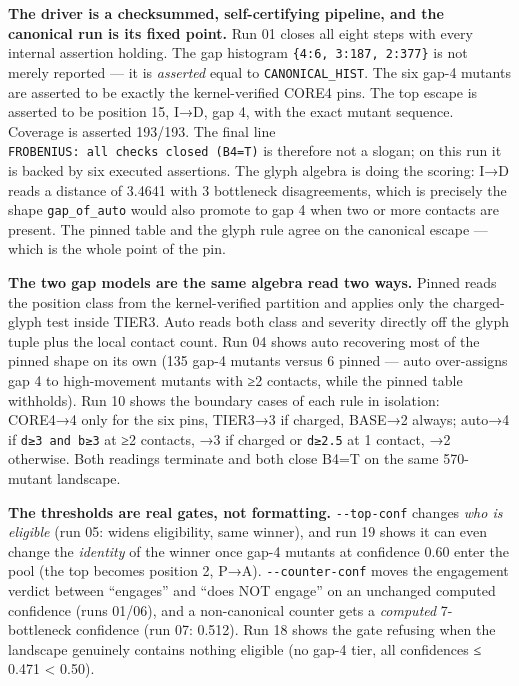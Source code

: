 \textbf{The driver is a checksummed, self-certifying pipeline, and the
canonical run is its fixed point.} Run 01 closes all eight steps with
every internal assertion holding. The gap histogram
\texttt{\{4:6,\ 3:187,\ 2:377\}} is not merely reported --- it is
\emph{asserted} equal to \texttt{CANONICAL\_HIST}. The six gap-4 mutants
are asserted to be exactly the kernel-verified CORE4 pins. The top
escape is asserted to be position 15, I→D, gap 4, with the exact mutant
sequence. Coverage is asserted 193/193. The final line
\texttt{FROBENIUS:\ all\ checks\ closed\ (B4=T)} is therefore not a
slogan; on this run it is backed by six executed assertions. The glyph
algebra is doing the scoring: I→D reads a distance of 3.4641 with 3
bottleneck disagreements, which is precisely the shape
\texttt{gap\_of\_auto} would also promote to gap 4 when two or more
contacts are present. The pinned table and the glyph rule agree on the
canonical escape --- which is the whole point of the pin.

\textbf{The two gap models are the same algebra read two ways.} Pinned
reads the position class from the kernel-verified partition and applies
only the charged-glyph test inside TIER3. Auto reads both class and
severity directly off the glyph tuple plus the local contact count. Run
04 shows auto recovering most of the pinned shape on its own (135 gap-4
mutants versus 6 pinned --- auto over-assigns gap 4 to high-movement
mutants with ≥2 contacts, while the pinned table withholds). Run 10
shows the boundary cases of each rule in isolation: CORE4→4 only for the
six pins, TIER3→3 if charged, BASE→2 always; auto→4 if
\texttt{d≥3\ and\ b≥3} at ≥2 contacts, →3 if charged or \texttt{d≥2.5}
at 1 contact, →2 otherwise. Both readings terminate and both close B4=T
on the same 570-mutant landscape.

\textbf{The thresholds are real gates, not formatting.}
\texttt{-\/-top-conf} changes \emph{who is eligible} (run 05: widens
eligibility, same winner), and run 19 shows it can even change the
\emph{identity} of the winner once gap-4 mutants at confidence 0.60
enter the pool (the top becomes position 2, P→A).
\texttt{-\/-counter-conf} moves the engagement verdict between
``engages'' and ``does NOT engage'' on an unchanged computed confidence
(runs 01/06), and a non-canonical counter gets a \emph{computed}
7-bottleneck confidence (run 07: 0.512). Run 18 shows the gate refusing
when the landscape genuinely contains nothing eligible (no gap-4 tier,
all confidences ≤ 0.471 \textless{} 0.50).

